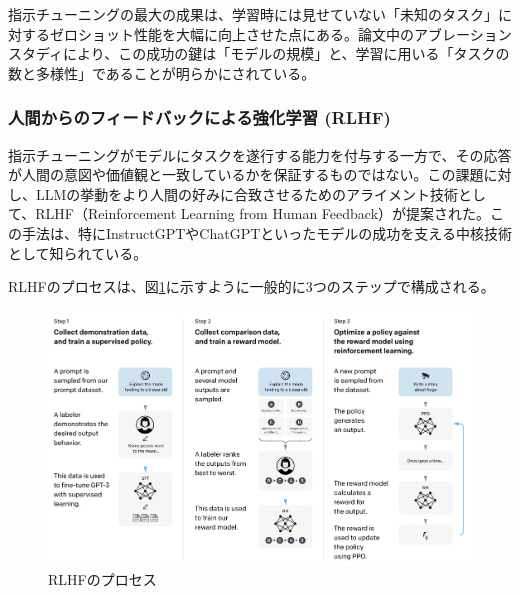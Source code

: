 \documentclass[a4paper,11pt]{jreport}
\begin{document}
指示チューニングの最大の成果は、学習時には見せていない「未知のタスク」に対するゼロショット性能を大幅に向上させた点にある。論文中のアブレーションスタディにより、この成功の鍵は「モデルの規模」と、学習に用いる「タスクの数と多様性」であることが明らかにされている。

\subsubsection{人間からのフィードバックによる強化学習 (RLHF)}
指示チューニングがモデルにタスクを遂行する能力を付与する一方で、その応答が人間の意図や価値観と一致しているかを保証するものではない。この課題に対し、LLMの挙動をより人間の好みに合致させるためのアライメント技術として、RLHF（Reinforcement Learning from Human Feedback）が提案された\cite{InstructGPT}。この手法は、特にInstructGPTやChatGPTといったモデルの成功を支える中核技術として知られている。

RLHFのプロセスは、図\ref{fig:rlhf_process}に示すように一般的に3つのステップで構成される\cite{InstructGPT}。

\begin{figure}[t]
  \centering
  \includegraphics[width=0.9\linewidth]{./fig/rlhf_fig2.png}
  \caption{RLHFのプロセス\cite{InstructGPT}}
  \label{fig:rlhf_process}
\end{figure}
\end{document}

